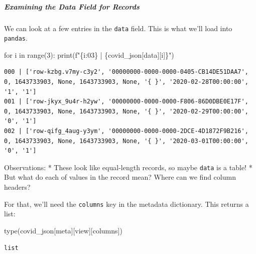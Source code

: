 \documentclass[
  letterpaper,
  DIV=11,
  numbers=noendperiod]{scrreprt}
\let\oldsubparagraph\subparagraph
\renewcommand{\subparagraph}[1]{\oldsubparagraph{#1}\mbox{}}
\newenvironment{Shaded}{\begin{snugshade}}{\end{snugshade}}
\newcommand{\BuiltInTok}[1]{\textcolor[rgb]{0.00,0.23,0.31}{#1}}
\newcommand{\ControlFlowTok}[1]{\textcolor[rgb]{0.00,0.23,0.31}{#1}}
\newcommand{\DecValTok}[1]{\textcolor[rgb]{0.68,0.00,0.00}{#1}}
\newcommand{\KeywordTok}[1]{\textcolor[rgb]{0.00,0.23,0.31}{#1}}
\newcommand{\NormalTok}[1]{\textcolor[rgb]{0.00,0.23,0.31}{#1}}
\newcommand{\SpecialCharTok}[1]{\textcolor[rgb]{0.37,0.37,0.37}{#1}}
\newcommand{\SpecialStringTok}[1]{\textcolor[rgb]{0.13,0.47,0.30}{#1}}
\newcommand{\StringTok}[1]{\textcolor[rgb]{0.13,0.47,0.30}{#1}}
\begin{document}
\hypertarget{examining-the-data-field-for-records}{%
\subparagraph{Examining the Data Field for
Records}\label{examining-the-data-field-for-records}}

We can look at a few entries in the \texttt{data} field. This is what
we'll load into \texttt{pandas}.

\begin{Shaded}
\begin{Highlighting}[]
\ControlFlowTok{for}\NormalTok{ i }\KeywordTok{in} \BuiltInTok{range}\NormalTok{(}\DecValTok{3}\NormalTok{):}
    \BuiltInTok{print}\NormalTok{(}\SpecialStringTok{f"}\SpecialCharTok{\{}\NormalTok{i}\SpecialCharTok{:03\}}\SpecialStringTok{ | }\SpecialCharTok{\{}\NormalTok{covid\_json[}\StringTok{\textquotesingle{}data\textquotesingle{}}\NormalTok{][i]}\SpecialCharTok{\}}\SpecialStringTok{"}\NormalTok{)}
\end{Highlighting}
\end{Shaded}

\begin{verbatim}
000 | ['row-kzbg.v7my-c3y2', '00000000-0000-0000-0405-CB14DE51DAA7', 0, 1643733903, None, 1643733903, None, '{ }', '2020-02-28T00:00:00', '1', '1']
001 | ['row-jkyx_9u4r-h2yw', '00000000-0000-0000-F806-86D0DBE0E17F', 0, 1643733903, None, 1643733903, None, '{ }', '2020-02-29T00:00:00', '0', '1']
002 | ['row-qifg_4aug-y3ym', '00000000-0000-0000-2DCE-4D1872F9B216', 0, 1643733903, None, 1643733903, None, '{ }', '2020-03-01T00:00:00', '0', '1']
\end{verbatim}

Observations: * These look like equal-length records, so maybe
\texttt{data} is a table! * But what do each of values in the record
mean? Where can we find column headers?

For that, we'll need the \texttt{columns} key in the metadata
dictionary. This returns a list:

\begin{Shaded}
\begin{Highlighting}[]
\BuiltInTok{type}\NormalTok{(covid\_json[}\StringTok{\textquotesingle{}meta\textquotesingle{}}\NormalTok{][}\StringTok{\textquotesingle{}view\textquotesingle{}}\NormalTok{][}\StringTok{\textquotesingle{}columns\textquotesingle{}}\NormalTok{])}
\end{Highlighting}
\end{Shaded}

\begin{verbatim}
list
\end{verbatim}
\end{document}
